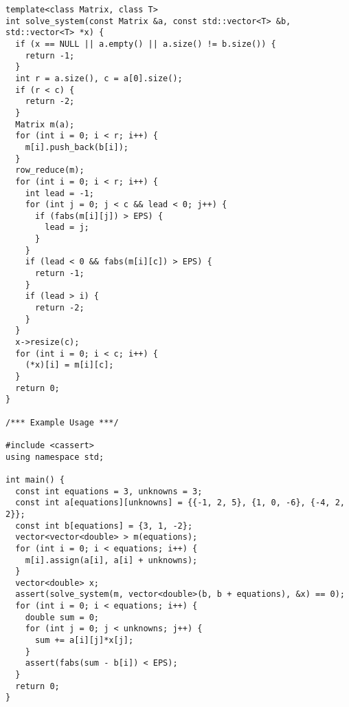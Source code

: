 \begin{lstlisting}
template<class Matrix, class T>
int solve_system(const Matrix &a, const std::vector<T> &b, std::vector<T> *x) {
  if (x == NULL || a.empty() || a.size() != b.size()) {
    return -1;
  }
  int r = a.size(), c = a[0].size();
  if (r < c) {
    return -2;
  }
  Matrix m(a);
  for (int i = 0; i < r; i++) {
    m[i].push_back(b[i]);
  }
  row_reduce(m);
  for (int i = 0; i < r; i++) {
    int lead = -1;
    for (int j = 0; j < c && lead < 0; j++) {
      if (fabs(m[i][j]) > EPS) {
        lead = j;
      }
    }
    if (lead < 0 && fabs(m[i][c]) > EPS) {
      return -1;
    }
    if (lead > i) {
      return -2;
    }
  }
  x->resize(c);
  for (int i = 0; i < c; i++) {
    (*x)[i] = m[i][c];
  }
  return 0;
}

/*** Example Usage ***/

#include <cassert>
using namespace std;

int main() {
  const int equations = 3, unknowns = 3;
  const int a[equations][unknowns] = {{-1, 2, 5}, {1, 0, -6}, {-4, 2, 2}};
  const int b[equations] = {3, 1, -2};
  vector<vector<double> > m(equations);
  for (int i = 0; i < equations; i++) {
    m[i].assign(a[i], a[i] + unknowns);
  }
  vector<double> x;
  assert(solve_system(m, vector<double>(b, b + equations), &x) == 0);
  for (int i = 0; i < equations; i++) {
    double sum = 0;
    for (int j = 0; j < unknowns; j++) {
      sum += a[i][j]*x[j];
    }
    assert(fabs(sum - b[i]) < EPS);
  }
  return 0;
}
\end{lstlisting}
